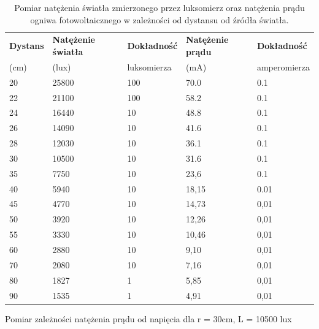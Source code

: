 \documentclass[polish, a4paper]{article}
\begin{document}
\begin{table}[H]
    \centering
    \begin{tabular}{|l|l|l|l|l|}
    \hline
        \textbf{Dystans} & \textbf{Natężenie światła} & \textbf{Dokładność} & \textbf{Natężenie prądu} & \textbf{Dokładność} \\ 
        (cm) & (lux) & luksomierza & (mA) & amperomierza \\ \hline
        20 & 25800 & 100 & 70.0 & 0.1  \\ \hline
        22 & 21100 & 100 & 58.2 & 0.1 \\ \hline
        24 & 16440 & 10 & 48.8 & 0.1 \\ \hline
        26 & 14090 & 10 & 41.6 & 0.1 \\ \hline
        28 & 12030 & 10 & 36.1 & 0.1 \\ \hline
        30 & 10500 & 10 & 31.6 & 0.1 \\ \hline
        35 & 7750 & 10 & 23,6 & 0.1 \\ \hline
        40 & 5940 & 10 & 18,15 & 0.01 \\ \hline
        45 & 4770 & 10 & 14,73 & 0,01 \\ \hline
        50 & 3920 & 10 & 12,26 & 0,01 \\ \hline
        55 & 3330 & 10 & 10,46 & 0,01 \\ \hline
        60 & 2880 & 10 & 9,10 & 0,01 \\ \hline
        70 & 2080 & 10 & 7,16 & 0,01 \\ \hline
        80 & 1827 & 1 & 5,85 & 0,01 \\ \hline
        90 & 1535 & 1 & 4,91 & 0,01 \\ \hline
    \end{tabular}
    \caption{Pomiar natężenia światła zmierzonego przez luksomierz oraz natężenia prądu ogniwa fotowoltaicznego w zależności od dystansu od źródła światła.}
\end{table}

\begin{table}[H]
    \centering
    \caption{Pomiar zależności natężenia prądu od napięcia dla r = 30cm, L = 10500 lux}
\end{table}
\end{document}
